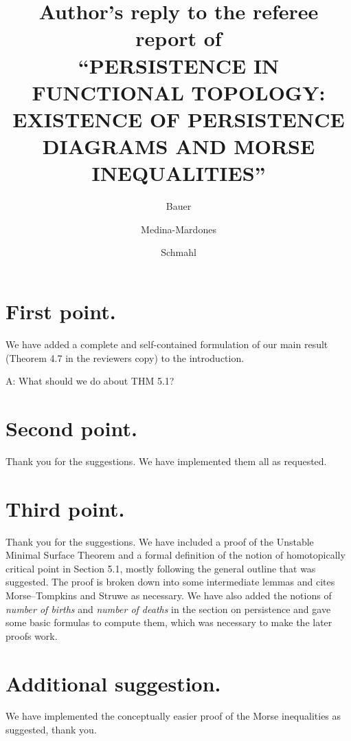 \documentclass{article}
\title{Author's reply to the referee report of \\ \textsc{
    ``PERSISTENCE IN FUNCTIONAL TOPOLOGY: EXISTENCE OF PERSISTENCE DIAGRAMS AND MORSE INEQUALITIES''
    }
}
\author{Bauer \and Medina-Mardones \and Schmahl}
\begin{document}
	\maketitle
	\section{First point.} We have added a complete and self-contained formulation of our main result (Theorem 4.7 in the reviewers copy) to the introduction.

	A: What should we do about THM 5.1?

	\section{Second point.} Thank you for the suggestions.
	We have implemented them all as requested.

	\section{Third point.} Thank you for the suggestions. 
	We have included a proof of the Unstable Minimal Surface Theorem and a formal definition of the notion of homotopically critical point in Section 5.1, mostly following the general outline that was suggested. 
	The proof is broken down into some intermediate lemmas and cites Morse--Tompkins and Struwe as necessary.
	We have also added the notions of \emph{number of births} and \emph{number of deaths} in the section on persistence and gave some basic formulas to compute them, which was necessary to make the later proofs work.

	\section{Additional suggestion.} We have implemented the conceptually easier proof of the Morse inequalities as suggested, thank you.
\end{document}
